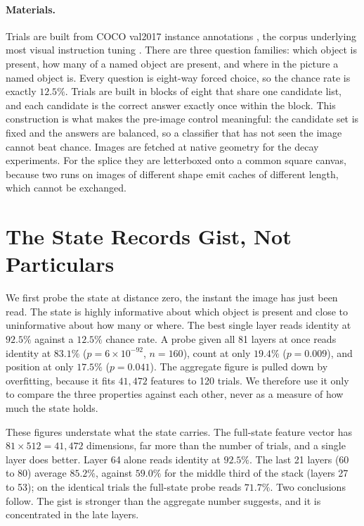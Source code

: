 \documentclass{article}
\begin{document}
\paragraph{Materials.} Trials are built from COCO val2017 instance annotations
\citep{lin2014coco}, the corpus underlying most visual instruction tuning
\citep{liu2023llava}. There are three question families: which object is
present, how many of a named object are present, and where in the picture a
named object is. Every question is eight-way forced choice, so the chance rate
is exactly $12.5\%$. Trials are built in blocks of eight that share one
candidate list, and each candidate is the correct answer exactly once within
the block. This construction is what makes the pre-image
control meaningful: the candidate set is fixed and the answers are balanced,
so a classifier that has not seen the image cannot beat chance. Images are
fetched at native geometry for the decay experiments. For the splice they are
letterboxed onto a common square canvas, because two runs on images of
different shape emit caches of different length, which cannot be exchanged.

\section{The State Records Gist, Not Particulars}
\label{sec:gist}

We first probe the state at distance zero, the instant the image has just been
read. The state is highly informative about which object is present and close
to uninformative about how many or where. The best single layer reads identity
at $92.5\%$ against a $12.5\%$ chance rate. A probe given all 81 layers at
once reads identity at $83.1\%$ ($p = 6 \times 10^{-92}$, $n = 160$), count at
only $19.4\%$ ($p = 0.009$), and position at only $17.5\%$ ($p = 0.041$). The
aggregate figure is pulled down by overfitting, because it fits $41{,}472$
features to 120 trials. We therefore use it only to compare the three
properties against each other, never as a measure of how much the state holds.

These figures understate what the state carries. The full-state
feature vector has $81 \times 512 = 41{,}472$ dimensions, far more than the
number of trials, and a single layer does better. Layer 64 alone reads
identity at $92.5\%$. The last 21 layers (60 to 80) average $85.2\%$, against
$59.0\%$ for the middle third of the stack (layers 27 to 53); on the identical
trials the full-state probe reads $71.7\%$. Two conclusions follow. The gist
is stronger than the aggregate number suggests, and it is concentrated in the
late layers.
\end{document}
